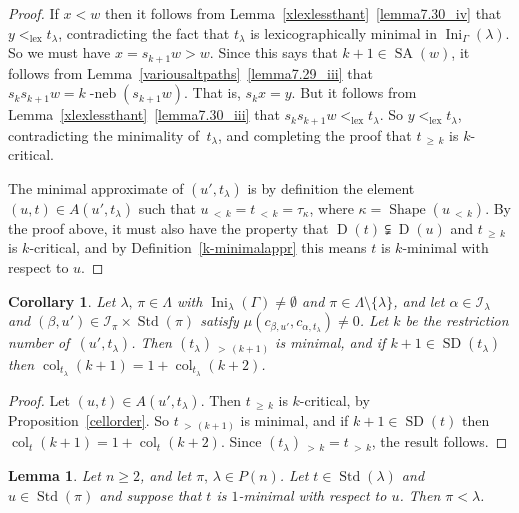 \documentclass[10pt]{amsart}
\newtheorem{lemm}[theo]{Lemma}
\newtheorem{coro}[theo]{Corollary}
\theoremstyle{definition}
\DeclareMathOperator{\Ini}{Ini}
\DeclareMathOperator{\lex}{lex}
\DeclareMathOperator{\col}{col}
\newcommand{\lessthan}[2]{#1\,{_{<\,#2}}}
\newcommand{\morethan}[2]{#1\,{_{>\,#2}}}
\newcommand{\Morethan}[2]{#1\,{_{\geqslant\,#2}}}
\DeclareMathOperator{\STD}{Std}
\DeclareMathOperator{\shape}{Shape}
\DeclareMathOperator{\neb}{-neb}
\DeclareMathOperator{\SD}{SD}
\DeclareMathOperator{\SA}{SA}
\DeclareMathOperator{\D}{D}
\begin{document}
\begin{proof}
If $x<w$ then it follows from Lemma~\ref{xlexlessthant}~\ref{lemma7.30_iv} that
$y<_{\lex}t_\lambda$, contradicting the fact that $t_\lambda$
is lexicographically minimal in $\Ini_\Gamma(\lambda)$.
So we must have $x=s_{k+1}w>w$. Since this says that $k+1\in\SA(w)$,
it follows from Lemma~\ref{variousaltpaths}~\ref{lemma7.29_iii} that
$s_ks_{k+1}w=k\neb(s_{k+1}w)$. That is, $s_kx=y$. But it
follows from Lemma~\ref{xlexlessthant}~\ref{lemma7.30_iii} that
$s_ks_{k+1}w<_{\lex}t_\lambda$. So $y<_{\lex}t_\lambda$,
contradicting the minimality of~$t_\lambda$, and completing the
proof that $\Morethan tk$ is $k$-critical.

The minimal approximate of $(u',t_\lambda)$ is by definition the
element $(u,t)\in A(u',t_\lambda)$ such that
$\lessthan uk=\lessthan tk=\tau_\kappa$, where
$\kappa=\shape(\lessthan uk)$. By the proof above, it
must also have the property that $\D(t)\subsetneqq\D(u)$ and
$\Morethan tk$ is $k$-critical, and by
Definition~\ref{k-minimalappr} this means $t$ is $k$-minimal
with respect to $u$.
\end{proof}

\begin{coro}\label{talphanystructure}
Let $\lambda,\,\pi\in\Lambda$ with $\Ini_\lambda(\Gamma)\ne\emptyset$ and
$\pi\in\Lambda\setminus\{\lambda\}$, and let $\alpha\in\mathcal I_\lambda$
and $(\beta,u')\in\mathcal I_\pi\times\STD(\pi)$ satisfy
$\mu(c_{\beta,u'},c_{\alpha,t_\lambda})\neq 0$.
Let $k$ be the restriction number of~$(u',t_\lambda)$.
Then $\morethan {(t_{\lambda})}{(k+1)}$ is minimal, and if $k+1\in\SD(t_{\lambda})$
then $\col_{t_{\lambda}}(k+1)=1+\col_{t_{\lambda}}(k+2)$.
\end{coro}

\begin{proof}
Let $(u,t)\in A(u',t_\lambda)$.
Then $\Morethan tk$ is $k$-critical, by Proposition~\ref{cellorder}. So
$\morethan t{(k+1)}$ is minimal, and if $k+1\in\SD(t)$ then
$\col_t(k+1)=1+\col_t(k+2)$. Since
$\morethan{(t_{\lambda})}k=\morethan tk$, the result follows.
\end{proof}

\begin{lemm}\label{1-minimalcomp}
Let $n\geq 2$, and let $\pi,\,\lambda\in P(n)$.
Let $t\in\STD(\lambda)$ and $u\in\STD(\pi)$ and suppose that $t$ is $1$-minimal with
respect to $u$. Then $\pi<\lambda$.
\end{lemm}
\end{document}
